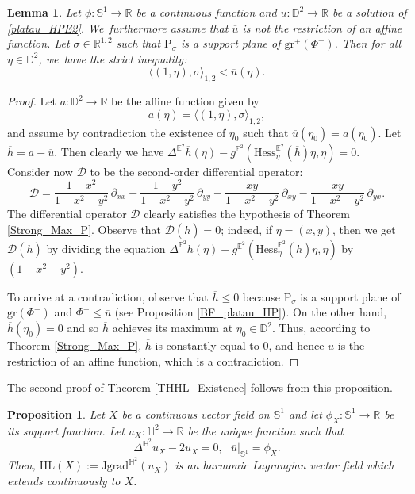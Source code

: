 \documentclass[11pt]{article}
\theoremstyle{plain}
\newtheorem{prop}[cor]{Proposition}
\newtheorem{lemma}[cor]{Lemma}
\theoremstyle{definition}
\newcommand{\minko}{\mathbb{R}^{1,2}}
\newcommand{\grad}{\mathrm{grad}^{\mathbb{H}^2}}
\newcommand{\J}{\mathrm{J}}
\begin{document}
\begin{lemma}\label{mean_up_convex_core}
Let $\phi: \mathbb{S}^1 \to \mathbb{R}$ be a continuous function and $\overline{u}: \mathbb{D}^2 \to \mathbb{R}$ be a solution of \eqref{platau_HPE2}. We~furthermore assume that $\overline{u}$ is not the restriction of an affine function. Let $\sigma \in \minko$ such that $\mathrm{P}_{\sigma}$ is a support plane of $\mathrm{gr}^+(\Phi^-)$. Then for all $\eta \in \mathbb{D}^2$, we~have the strict inequality:
\[
\langle (1,\eta), \sigma \rangle_{1,2} < \overline{u}(\eta).
\]
\end{lemma}

\begin{proof}
Let $a: \mathbb{D}^2 \to \mathbb{R}$ be the affine function given by
\[
a(\eta) = \langle (1,\eta), \sigma \rangle_{1,2},
\]
and assume by contradiction the existence of $\eta_0$ such that $\overline{u}(\eta_0) = a(\eta_0)$. Let $\overline{h} = a - \overline{u}$. Then clearly we have $\Delta^{\mathbb{E}^2}\overline{h}(\eta) - g^{\mathbb{E}^2}(\mathrm{Hess}^{\mathbb{E}^2}_\eta(\overline{h})\eta, \eta) = 0$.\\
Consider now $\mathcal{D}$ to be the second-order differential operator:
\begin{equation}\label{strictelliptic}
\mathcal{D} = \frac{1-x^2}{1-x^2-y^2}\,\partial_{xx} + \frac{1-y^2}{1-x^2-y^2}\,\partial_{yy} - \frac{xy}{1-x^2-y^2}\,\partial_{xy} - \frac{xy}{1-x^2-y^2}\,\partial_{yx}.
\end{equation}
The differential operator $\mathcal{D}$ clearly satisfies the hypothesis of Theorem \ref{Strong_Max_P}. Observe that $\mathcal{D}(\overline{h}) = 0$; indeed, if $\eta = (x,y)$, then we get $\mathcal{D}(\overline{h})$ by dividing the equation $\Delta^{\mathbb{E}^2}\overline{h}(\eta) - g^{\mathbb{E}^2}(\mathrm{Hess}^{\mathbb{E}^2}_\eta(\overline{h})\eta, \eta)$ by $(1-x^2-y^2)$.

To arrive at a contradiction, observe that $\overline{h} \leq 0$ because $\mathrm{P}_{\sigma}$ is a support plane of $\mathrm{gr}(\Phi^-)$ and $\Phi^- \leq \overline{u}$ (see Proposition \ref{BF_platau_HP}). On the other hand, $\overline{h}(\eta_0) = 0$ and so $\overline{h}$ achieves its maximum at $\eta_0 \in \mathbb{D}^2$. Thus, according to Theorem \ref{Strong_Max_P}, $\overline{h}$ is constantly equal to $0$, and hence $\overline{u}$ is the restriction of an affine function, which is a contradiction.
\end{proof}
The second proof of Theorem \ref{THHL_Existence} follows from this proposition.
\begin{prop}\label{second_proof}
Let $X$ be a continuous vector field on $\mathbb{S}^1$ and let $\phi_X:\mathbb{S}^1\to\mathbb{R}$ be its support function. Let $u_X:\mathbb{H}^2\to\mathbb{R}$ be the unique function such that \begin{equation}\label{platau_HP_proof}
\Delta^{\mathbb{H}^2} u_X-2u_X=0 ,\ \ \ \overline{u}|_{\mathbb{S}^1}=\phi_X.
\end{equation}
Then, $\mathrm{HL}(X):=\J\grad(u_X)$ is an harmonic Lagrangian vector field which extends continuously to $X$.
\end{prop}
\end{document}
